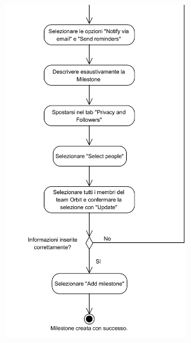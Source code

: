 \begin{center}
	\includegraphics[width=8cm]{./DiagrammiProcedure/CreazioneMilestone2.png}
\end{center}

